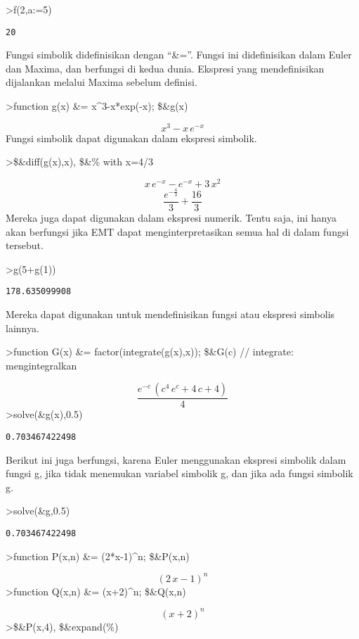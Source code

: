 \documentclass[
]{book}
\begin{document}
\textgreater f(2,a:=5)

\begin{verbatim}
20
\end{verbatim}

Fungsi simbolik didefinisikan dengan ``\&=''. Fungsi ini didefinisikan dalam Euler dan Maxima, dan berfungsi di kedua dunia. Ekspresi yang mendefinisikan dijalankan melalui Maxima sebelum definisi.

\textgreater function g(x) \&= x\^{}3-x*exp(-x); \$\&g(x)

\[x^3-x\,e^ {- x }\]Fungsi simbolik dapat digunakan dalam ekspresi simbolik.

\textgreater\$\&diff(g(x),x), \$\&\% with x=4/3

\[x\,e^ {- x }-e^ {- x }+3\,x^2\] \[\frac{e^ {- \frac{4}{3} }}{3}+\frac{16}{3}\]Mereka juga dapat digunakan dalam ekspresi numerik. Tentu saja, ini hanya akan berfungsi jika EMT dapat menginterpretasikan semua hal di dalam fungsi tersebut.

\textgreater g(5+g(1))

\begin{verbatim}
178.635099908
\end{verbatim}

Mereka dapat digunakan untuk mendefinisikan fungsi atau ekspresi simbolis lainnya.

\textgreater function G(x) \&= factor(integrate(g(x),x)); \$\&G(c) // integrate: mengintegralkan

\[\frac{e^ {- c }\,\left(c^4\,e^{c}+4\,c+4\right)}{4}\]\textgreater solve(\&g(x),0.5)

\begin{verbatim}
0.703467422498
\end{verbatim}

Berikut ini juga berfungsi, karena Euler menggunakan ekspresi simbolik dalam fungsi g, jika tidak menemukan variabel simbolik g, dan jika ada fungsi simbolik g.

\textgreater solve(\&g,0.5)

\begin{verbatim}
0.703467422498
\end{verbatim}

\textgreater function P(x,n) \&= (2*x-1)\^{}n; \$\&P(x,n)

\[\left(2\,x-1\right)^{n}\]\textgreater function Q(x,n) \&= (x+2)\^{}n; \$\&Q(x,n)

\[\left(x+2\right)^{n}\]\textgreater\$\&P(x,4), \$\&expand(\%)
\end{document}
